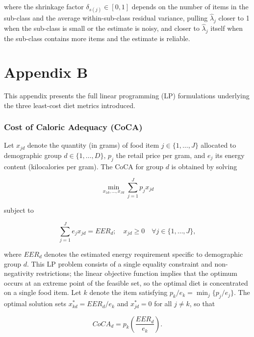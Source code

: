 \documentclass[Afour, sageh,times]{sagej}
\begin{document}
where the shrinkage factor $\delta_{s(j)} \in [0,1]$ depends on the number of items in the sub-class and the average within-sub-class residual variance, pulling $\hat{\lambda}_j$ closer to 1 when the sub-class is small or the estimate is noisy, and closer to $\hat{\lambda}_j$ itself when the sub-class contains more items and the estimate is reliable.

\section*{Appendix B}
\label{secA_lp}

This appendix presents the full linear programming (LP) formulations underlying the three least-cost diet metrics introduced.

\subsubsection*{Cost of Caloric Adequacy (CoCA)}
Let $x_{jd}$ denote the quantity (in grams) of food item $j \in \{1, \ldots, J\}$ allocated to demographic group $d \in \{1, \ldots, D\}$, $p_j$ the retail price per gram, and $e_j$ its energy content (kilocalories per gram). The CoCA for group $d$ is obtained by solving


\begin{equation}
    \min_{x_{1d}, \ldots, x_{Jd}} \sum_{j=1}^{J} p_{j} x_{jd}
\end{equation}

subject to

\begin{equation}
    \sum_{j=1}^{J} e_{j} x_{jd} = EER_{d}; \quad x_{jd} \geq 0 \quad \forall j \in \{1, \ldots, J\},
\end{equation}

where $EER_d$ denotes the estimated energy requirement specific to demographic group $d$. This LP problem consists of a single equality constraint and non-negativity restrictions; the linear objective function implies that the optimum occurs at an extreme point of the feasible set, so the optimal diet is concentrated on a single food item. Let $k$ denote the item satisfying $p_{k}/e_{k} = \min_{j}\{p_{j}/e_{j}\}$. The optimal solution sets $x_{kd}^{*} = EER_d/e_{k}$ and $x_{jd}^{*} = 0$ for all $j \neq k$, so that

\begin{equation}
    CoCA_d = p_k \left(\frac{EER_d}{e_k}\right).
\end{equation}
\end{document}
